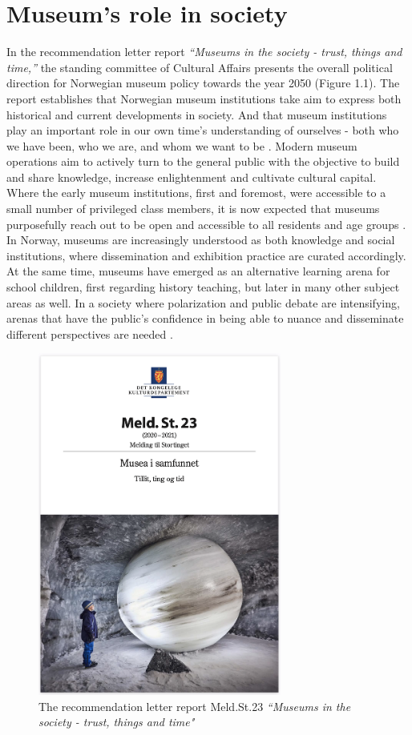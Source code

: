 \section{Museum's role in society}

In the recommendation letter report \emph{“Museums in the society - trust, things and time,”} the standing committee of Cultural Affairs presents the overall political direction for Norwegian museum policy towards the year 2050 (Figure 1.1). The report establishes that Norwegian museum institutions take aim to express both historical and current developments in society. And that museum institutions play an important role in our own time’s understanding of ourselves - both who we have been, who we are, and whom we want to be \autocite[p. 7]{melding23}. Modern museum operations aim to actively turn to the general public with the objective to build and share knowledge, increase enlightenment and cultivate cultural capital. Where the early museum institutions, first and foremost, were accessible to a small number of privileged class members, it is now expected that museums purposefully reach out to be open and accessible to all residents and age groups \autocite[p. 14]{melding23}. In Norway, museums are increasingly understood as both knowledge and social institutions, where dissemination and exhibition practice are curated accordingly. At the same time, museums have emerged as an alternative learning arena for school children, first regarding history teaching, but later in many other subject areas as well. In a society where polarization and public debate are intensifying, arenas that have the public's confidence in being able to nuance and disseminate different perspectives are needed \autocite[p. 7]{melding23}.

\begin{figure}[H]
\centering
\includegraphics[width=8cm]{pictures/Introduction/stortingsmelding_hoykant.png}
\caption{The recommendation letter report Meld.St.23 \emph{“Museums in the society - trust, things and time"}}
\end{figure}


